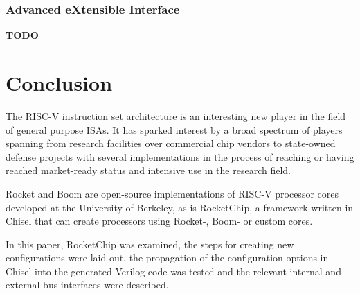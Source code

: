 \documentclass[journal,a4paper]{IEEEtran}
\begin{document}
\subsubsection{Advanced eXtensible Interface}
\textbf{TODO}

















\section{Conclusion}
The RISC-V instruction set architecture is an interesting new player in the field of general purpose ISAs.
It has sparked interest by a broad spectrum of players spanning from research facilities over commercial chip vendors to state-owned defense projects with several implementations in the process of reaching or having reached market-ready status and intensive use in the research field.

Rocket and Boom are open-source implementations of RISC-V processor cores developed at the University of Berkeley, as is RocketChip, a framework written in Chisel that can create processors using Rocket-, Boom- or custom cores.

In this paper, RocketChip was examined, the steps for creating new configurations were laid out, the propagation of the configuration options in Chisel into the generated Verilog code was tested and the relevant internal and external bus interfaces were described.







\bigskip
\end{document}
